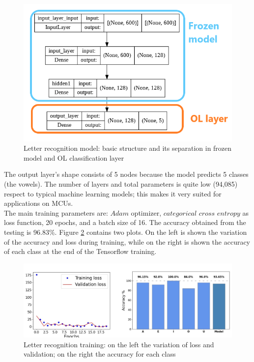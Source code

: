 \documentclass[12pt]{report}
\begin{document}
\begin{figure}[h!]
    \centering
    \includegraphics[width=120mm]{Figures/Chapter4/letter_structure.png} 
    \caption{Letter recognition model: basic structure and its separation in frozen model and OL classification layer}
    \label{fig:letter_structure}    
\end{figure}

The output layer's shape consists of 5 nodes because the model predicts 5 classes (the vowels). The number of layers and total parameters is quite low (94,085) respect to typical machine learning models; this makes it very suited for applications on MCUs. \\
The main training parameters are: $Adam$ optimizer, $categorical$ $cross$ $entropy$ as loss function, 20 epochs, and a batch size of 16. 
The accuracy obtained from the testing is 96.83\%. Figure \ref{fig:training_letters} contains two plots. On the left is shown the variation of the accuracy and loss during training, while on the right is shown the accuracy of each class at the end of the Tensorflow training.\\

\begin{figure}[h!]
    \centering
    \includegraphics[width=120mm]{Figures/Chapter4/training_letters.jpg} 
    \caption{Letter recognition training: on the left the variation of loss and validation; on the right the accuracy for each class}
    \label{fig:training_letters}    
\end{figure}
\end{document}
